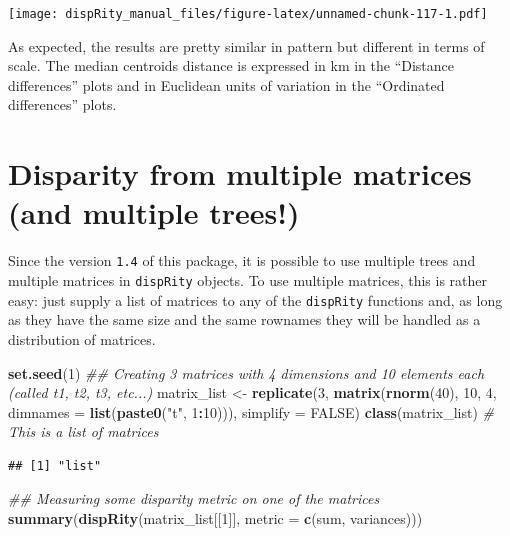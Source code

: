 \documentclass[
]{book}
\newenvironment{Shaded}{\begin{snugshade}}{\end{snugshade}}
\newcommand{\CommentTok}[1]{\textcolor[rgb]{0.56,0.35,0.01}{\textit{#1}}}
\newcommand{\DataTypeTok}[1]{\textcolor[rgb]{0.13,0.29,0.53}{#1}}
\newcommand{\DecValTok}[1]{\textcolor[rgb]{0.00,0.00,0.81}{#1}}
\newcommand{\KeywordTok}[1]{\textcolor[rgb]{0.13,0.29,0.53}{\textbf{#1}}}
\newcommand{\NormalTok}[1]{#1}
\newcommand{\OperatorTok}[1]{\textcolor[rgb]{0.81,0.36,0.00}{\textbf{#1}}}
\newcommand{\OtherTok}[1]{\textcolor[rgb]{0.56,0.35,0.01}{#1}}
\newcommand{\StringTok}[1]{\textcolor[rgb]{0.31,0.60,0.02}{#1}}
\begin{document}
\texttt{[image: dispRity\_manual\_files/figure-latex/unnamed-chunk-117-1.pdf]}

As expected, the results are pretty similar in pattern but different in terms of scale.
The median centroids distance is expressed in km in the ``Distance differences'' plots and in Euclidean units of variation in the ``Ordinated differences'' plots.

\hypertarget{multi.input}{%
\section{Disparity from multiple matrices (and multiple trees!)}\label{multi.input}}

Since the version \texttt{1.4} of this package, it is possible to use multiple trees and multiple matrices in \texttt{dispRity} objects.
To use multiple matrices, this is rather easy: just supply a list of matrices to any of the \texttt{dispRity} functions and, as long as they have the same size and the same rownames they will be handled as a distribution of matrices.

\begin{Shaded}
\begin{Highlighting}[]
\KeywordTok{set.seed}\NormalTok{(}\DecValTok{1}\NormalTok{)}
\CommentTok{\#\# Creating 3 matrices with 4 dimensions and 10 elements each (called t1, t2, t3, etc...)}
\NormalTok{matrix\_list \textless{}{-}}\StringTok{ }\KeywordTok{replicate}\NormalTok{(}\DecValTok{3}\NormalTok{, }\KeywordTok{matrix}\NormalTok{(}\KeywordTok{rnorm}\NormalTok{(}\DecValTok{40}\NormalTok{), }\DecValTok{10}\NormalTok{, }\DecValTok{4}\NormalTok{, }\DataTypeTok{dimnames =} \KeywordTok{list}\NormalTok{(}\KeywordTok{paste0}\NormalTok{(}\StringTok{"t"}\NormalTok{, }\DecValTok{1}\OperatorTok{:}\DecValTok{10}\NormalTok{))),}
                         \DataTypeTok{simplify =} \OtherTok{FALSE}\NormalTok{)}
\KeywordTok{class}\NormalTok{(matrix\_list) }\CommentTok{\# This is a list of matrices}
\end{Highlighting}
\end{Shaded}

\begin{verbatim}
## [1] "list"
\end{verbatim}

\begin{Shaded}
\begin{Highlighting}[]
\CommentTok{\#\# Measuring some disparity metric on one of the matrices}
\KeywordTok{summary}\NormalTok{(}\KeywordTok{dispRity}\NormalTok{(matrix\_list[[}\DecValTok{1}\NormalTok{]], }\DataTypeTok{metric =} \KeywordTok{c}\NormalTok{(sum, variances)))}
\end{Highlighting}
\end{Shaded}
\end{document}
